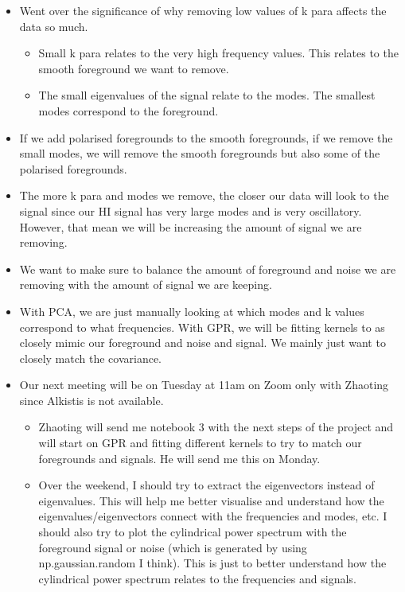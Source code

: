 \begin{itemize}
    \item Went over the significance of why removing low values of k para affects the data so much.
    \begin{itemize}
        \item Small k para relates to the very high frequency values. This relates to the smooth foreground we want to remove.
        \item The small eigenvalues of the signal relate to the modes. The smallest modes correspond to the foreground.
    \end{itemize}
\item If we add polarised foregrounds to the smooth foregrounds, if we remove the small modes, we will remove the smooth foregrounds but also some of the polarised foregrounds.
\item The more k para and modes we remove, the closer our data will look to the signal since our HI signal has very large modes and is very oscillatory. However, that mean we will be increasing the amount of signal we are removing.
\item We want to make sure to balance the amount of foreground and noise we are removing with the amount of signal we are keeping. 
\item With PCA, we are just manually looking at which modes and k values correspond to what frequencies. With GPR, we will be fitting kernels to as closely mimic our foreground and noise and signal. We mainly just want to closely match the covariance.
\item Our next meeting will be on Tuesday at 11am on Zoom only with Zhaoting since Alkistis is not available.
\begin{itemize}
    \item Zhaoting will send me notebook 3 with the next steps of the project and will start on GPR and fitting different kernels to try to match our foregrounds and signals. He will send me this on Monday.
    \item Over the weekend, I should try to extract the eigenvectors instead of eigenvalues. This will help me better visualise and understand how the eigenvalues/eigenvectors connect with the frequencies and modes, etc. I should also try to plot the cylindrical power spectrum with the foreground signal or noise (which is generated by using np.gaussian.random I think). This is just to better understand how the cylindrical power spectrum relates to the frequencies and signals.
\end{itemize}
\end{itemize}

